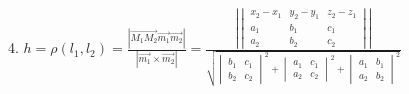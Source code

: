 \documentclass[a4paper, 10pt]{article}
\newcommand{\bvec}[1]{\overrightarrow{#1}}
\renewcommand{\a}{\vec{a}}
\renewcommand{\b}{\vec{b}}
\begin{document}
4. $h = \rho(l_1, l_2) = \frac{ |\bvec{M_1M_2}\vec{m_1}\vec{m_2}| }{ |\vec{m_1}\times\vec{m_2}| }=
\frac{ |\begin{vmatrix}x_2-x_1&y_2-y_1&z_2-z_1\\a_1&b_1&c_1\\a_2&b_2&c_2\end{vmatrix}| }
    {\sqrt{\begin{vmatrix}b_1&c_1\\b_2&c_2\end{vmatrix}^2+
    \begin{vmatrix}a_1&c_1\\a_2&c_2\end{vmatrix}^2+
    \begin{vmatrix}a_1&b_1\\a_2&b_2\end{vmatrix}^2}}$
\end{document}
